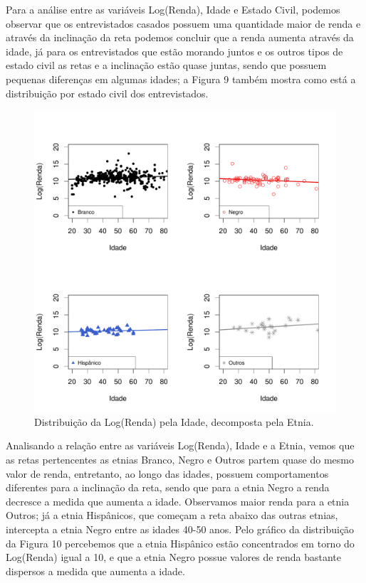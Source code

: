 \documentclass[]{article}
\begin{document}
Para a análise entre as variáveis Log(Renda), Idade e Estado Civil,
podemos observar que os entrevistados casados possuem uma quantidade
maior de renda e através da inclinação da reta podemos concluir que a
renda aumenta através da idade, já para os entrevistados que estão
morando juntos e os outros tipos de estado civil as retas e a inclinação
estão quase juntas, sendo que possuem pequenas diferenças em algumas
idades; a Figura 9 também mostra como está a distribuição por estado
civil dos entrevistados.

\begin{figure}[H]

{\centering \includegraphics[width=0.6\linewidth]{p28-graf} 

}

\caption{Distribuição da Log(Renda) pela Idade, decomposta pela Etnia.}\label{fig:unnamed-chunk-17}
\end{figure}

Analisando a relação entre as variáveis Log(Renda), Idade e a Etnia,
vemos que as retas pertencentes as etnias Branco, Negro e Outros partem
quase do mesmo valor de renda, entretanto, ao longo das idades, possuem
comportamentos diferentes para a inclinação da reta, sendo que para a
etnia Negro a renda decresce a medida que aumenta a idade. Observamos
maior renda para a etnia Outros; já a etnia Hispânicos, que começam a
reta abaixo das outras etnias, intercepta a etnia Negro entre as idades
40-50 anos. Pelo gráfico da distribuição da Figura 10 percebemos que a
etnia Hispânico estão concentrados em torno do Log(Renda) igual a 10, e
que a etnia Negro possue valores de renda bastante dispersos a medida
que aumenta a idade.
\end{document}

